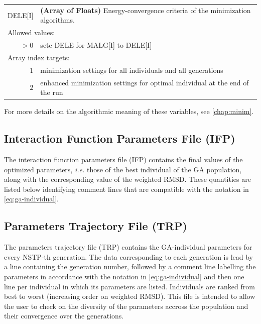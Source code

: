\documentclass[10pt,a4paper,openany]{memoir}
\numberwithin{equation}{section}
\begin{document}
{
\begin{tabular}{r@{ : }l}
\label{descr:dele}
      DELE[I]&\textbf{(Array of Floats)} Energy-convergence criteria of the minimization algorithms.                                          \\ 
\multicolumn{2}{l}{Allowed values:} \\ 
    \(>0\)&sete DELE for MALG[I] to DELE[I] \\ 
\multicolumn{2}{l}{Array index targets:} \\ 
  \(1\)&minimization settings for all individuals and all generations \\
  \(2\)&enhanced minimization settings for optimal individual at the end of the run \\
\end{tabular}
\vspace{1ex}
}

\noindent For more details on the algorithmic meaning of these variables, see \autoref{chap:minim}.



\subsection{Interaction Function Parameters File (IFP)}
\label{sec:file-formats-IFP}

The interaction function parameters file (IFP) contains the final
values of the optimized parameters, \textit{i.e.} those of the best
individual of the GA population, along with the corresponding value of
the weighted RMSD. These quantities are listed below identifying
comment lines that are compatible with the notation in
\autoref{eq:ga-individual}.

\subsection{Parameters Trajectory File (TRP)}
\label{sec:file-formats-TRP}

The parameters trajectory file (TRP) contains the GA-individual
parameters for every NSTP-th generation.  The data corresponding to
each generation is lead by a line containing the generation number,
followed by a comment line labelling the parameters in accordance with
the notation in \autoref{eq:ga-individual} and then one line per
individual in which its parameters are listed. Individuals are ranked
from best to worst (increasing order on weighted RMSD). This file is
intended to allow the user to check on the diversity of the parameters
accross the population and their convergence over the generations.
\end{document}
